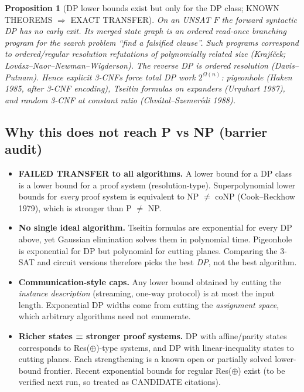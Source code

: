 \documentclass[11pt]{article}
\newtheorem{prop}{Proposition}
\begin{document}
\begin{prop}[DP lower bounds exist but only for the DP class; KNOWN THEOREMS $\Rightarrow$ EXACT TRANSFER]
On an UNSAT $F$ the forward syntactic DP has no early exit. Its merged state graph is an
ordered read-once branching program for the search problem ``find a falsified clause''.
Such programs correspond to ordered/regular resolution refutations of polynomially related
size (Krajíček; Lovász--Naor--Newman--Wigderson). The reverse DP \emph{is} ordered
resolution (Davis--Putnam). Hence explicit 3-CNFs force total DP work $2^{\Omega(n)}$:
pigeonhole (Haken 1985, after 3-CNF encoding), Tseitin formulas on expanders (Urquhart 1987),
and random 3-CNF at constant ratio (Chvátal--Szemerédi 1988).
\end{prop}

\subsection{Why this does not reach P vs NP (barrier audit)}
\begin{itemize}
\item \textbf{FAILED TRANSFER to all algorithms.} A lower bound for a DP class is a lower
bound for a proof system (resolution-type). Superpolynomial lower bounds for \emph{every}
proof system is equivalent to NP $\ne$ coNP (Cook--Reckhow 1979), which is stronger than P $\ne$ NP.
\item \textbf{No single ideal algorithm.} Tseitin formulas are exponential for every DP above,
yet Gaussian elimination solves them in polynomial time. Pigeonhole is exponential for DP
but polynomial for cutting planes. Comparing the 3-SAT and circuit versions therefore picks the best \emph{DP}, not the best algorithm.
\item \textbf{Communication-style caps.} Any lower bound obtained by cutting the
\emph{instance description} (streaming, one-way protocol) is at most the input length.
Exponential DP widths come from cutting the \emph{assignment space}, which arbitrary
algorithms need not enumerate.
\item \textbf{Richer states = stronger proof systems.} DP with affine/parity states
corresponds to Res($\oplus$)-type systems, and DP with linear-inequality states to cutting
planes. Each strengthening is a known open or partially solved lower-bound frontier.
Recent exponential bounds for regular Res($\oplus$) exist (to be verified next run, so
treated as CANDIDATE citations).
\end{itemize}
\end{document}
